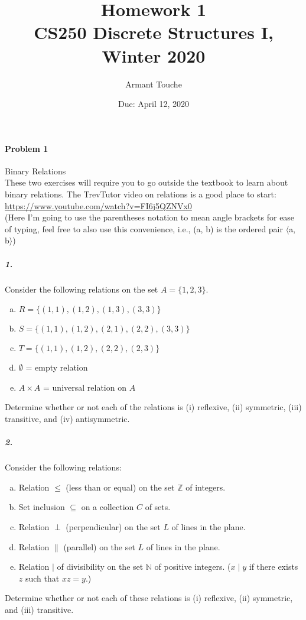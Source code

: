 \documentclass[11pt, a4paper]{article}
\title{\bf Homework 1\\[1ex]
\rm\normalsize CS250 Discrete Structures I, Winter 2020 }
\date{\normalsize Due: April 12, 2020}
\author{\normalsize Armant Touche}
\newcommand{\stuple}[1]{$\langle$#1$\rangle$} %
\begin{document}
 
\vspace{0cm}\maketitle 
	\paragraph{Problem 1} Binary Relations\\
	These two exercises will require you to go outside the textbook to learn about binary relations. The TrevTutor video on relations is a good place to start: \url{https://www.youtube.com/watch?v=FI6j5QZNVx0}\\
	(Here I'm going to use the parentheses notation to mean angle brackets for ease of typing, feel free to also use this convenience, i.e., (a, b) is the ordered pair \stuple{a, b})
		\subparagraph{1.} Consider the following relations on the set $A = \{1, 2, 3\}$.
        \begin{enumerate}[(a)]
			\item $R = \{(1, 1), (1, 2), (1, 3), (3, 3)\}$
			\item $S = \{(1, 1), (1, 2), (2, 1), (2, 2), (3, 3)\}$
			\item $T = \{(1, 1), (1, 2), (2, 2), (2, 3)\}$
			\item $\emptyset$ = empty relation
			\item $A \times A$ = universal relation on $A$
        \end{enumerate}
		Determine whether or not each of the relations is (i) reflexive, (ii) symmetric, (iii) transitive, and (iv) antisymmetric.
		\subparagraph{2.} Consider the following relations:
        \begin{enumerate}[(a)]
			\item Relation $\leq$ (less than or equal) on the set $\mathbb{Z}$ of integers.
			\item Set inclusion $\subseteq$ on a collection $C$ of sets.
			\item Relation $\perp$ (perpendicular) on the set $L$ of lines in the plane.
			\item Relation $\parallel$ (parallel) on the set $L$ of lines in the plane.
			\item Relation $\mid$ of divisibility on the set $\mathbb{N}$ of positive integers. ($x \mid y$ if there exists $z$ such that $xz = y$.)
        \end{enumerate}
		
		Determine whether or not each of these relations is (i) reflexive, (ii) symmetric, and (iii) transitive.	
\end{document}
